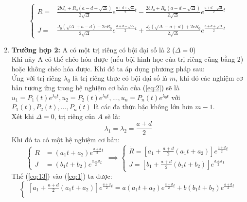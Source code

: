 \documentclass[a4paper]{article}
\begin{document}
\begin{enumerate}
\begin{equation}
\begin{cases}
            R = & \frac{2bJ_0 + R_0(a-d+\sqrt{\Delta})}{2\sqrt{\Delta}} e^{\frac{a+d+\sqrt{\Delta}}{2}t} - \frac{2bJ_0 + R_0(a-d-\sqrt{\Delta})}{2\sqrt{\Delta}} e^{\frac{a+d-\sqrt{\Delta}}{2}t} \\ \\
            J = & \frac{J_0(\sqrt{\Delta}+a-d) - 2cR_0}{2\sqrt{\Delta}} e^{\frac{a+d-\sqrt{\Delta}}{2}t}
            + \frac{J_0(\sqrt{\Delta}-a+d) + 2cR_0}{2\sqrt{\Delta}} e^{\frac{a+d+\sqrt{\Delta}}{2}t}
        \end{cases}
    \end{equation}
    \item \textbf{Trường hợp 2:} A có một trị riêng có bội đại số là 2 ($\Delta = 0$) \\
    Khi này A có thể chéo hóa được (nếu bội hình học của trị riêng cũng bằng 2) hoặc không chéo hóa được. Khi đó ta áp dụng phương pháp sau: \\
    Ứng với trị riêng $\lambda_0$ là trị riêng thực có bội đại số là $m$, khi đó các nghiệm cơ bản tương ứng trong hệ nghiệm cơ bản của (\ref{eq:2}) sẽ là $u_1=P_1(t)e^{\lambda_0t},u_2=P_2(t)e^{\lambda_0t},...,u_n=P_n(t)e^{\lambda_0t}$ với $P_1(t),P_2(t),...,P_n(t)$ là các đa thức bậc không lớn hơn $m-1$.\\
    Xét khi $\Delta=0$, trị riêng của $A$ sẽ là:
    \begin{equation} \label{eq:12}
        \lambda_1 = \lambda_2 = \frac{a+d}{2}
    \end{equation}
    Khi đó ta có một hệ nghiệm cơ bản:
    \begin{equation} \label{eq:13}
        \begin{cases}
            R&=(a_1t+a_2)e^{\frac{a+d}{2}t}\\[3pt]
            J&=(b_1t+b_2)e^{\frac{a+d}{2}t}
        \end{cases}
        \implies \begin{cases}
            \dot{R}= \left[a_1 + \frac{a+d}{2}\left(a_1t+a_2\right)\right]e^{\frac{a+d}{2}t} \\[3pt] 
            \dot{J}= \left[b_1 + \frac{a+d}{2}\left(b_1t+b_2\right)\right]e^{\frac{a+d}{2}t}
        \end{cases}
    \end{equation}
    Thế (\ref{eq:13}) vào (\ref{eq:1}) ta được:
    \begin{equation}
    \begin{cases}
    \nonumber
        \left[a_1 + \frac{a+d}{2}\left(a_1t+a_2\right)\right]e^{\frac{a+d}{2}t} = a(a_1t+a_2)e^{\frac{a+d}{2}t} + b(b_1t+b_2)e^{\frac{a+d}{2}t} \\[3pt]

\end{cases}
\end{equation}
\end{enumerate}
\end{document}

